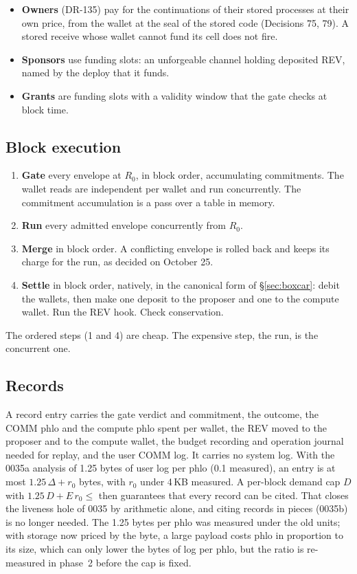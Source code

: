 \documentclass[11pt]{article}
\newcommand{\code}{\path}
\begin{document}
\begin{itemize}
\item \textbf{Owners} (DR-135) pay for the continuations of their stored processes at their own price, from the wallet at the seal of the stored code (Decisions 75, 79). A stored receive whose wallet cannot fund its cell does not fire.
\item \textbf{Sponsors} use funding slots: an unforgeable channel holding deposited REV, named by the deploy that it funds.
\item \textbf{Grants} are funding slots with a validity window that the gate checks at block time.
\end{itemize}

\subsection{Block execution}

\begin{enumerate}
\item \textbf{Gate} every envelope at $R_0$, in block order, accumulating commitments. The wallet reads are independent per wallet and run concurrently. The commitment accumulation is a pass over a table in memory.
\item \textbf{Run} every admitted envelope concurrently from $R_0$.
\item \textbf{Merge} in block order. A conflicting envelope is rolled back and keeps its charge for the run, as decided on October 25.
\item \textbf{Settle} in block order, natively, in the canonical form of \S\ref{sec:boxcar}: debit the wallets, then make one deposit to the proposer and one to the compute wallet. Run the REV hook. Check conservation.
\end{enumerate}
The ordered steps (1 and 4) are cheap. The expensive step, the run, is the concurrent one.

\subsection{Records}

A record entry carries the gate verdict and commitment, the outcome, the COMM phlo and the compute phlo spent per wallet, the REV moved to the proposer and to the compute wallet, the budget recording and operation journal needed for replay, and the user COMM log. It carries no system log. With the 0035a analysis of 1.25 bytes of user log per phlo (0.1 measured), an entry is at most $1.25\,\Delta + r_0$ bytes, with $r_0$ under 4\,KB measured. A per-block demand cap $D$ with $1.25\,D + E\,r_0 \le$ \code{block-record-bytes} then guarantees that every record can be cited. That closes the liveness hole of 0035 by arithmetic alone, and citing records in pieces (0035b) is no longer needed. The 1.25 bytes per phlo was measured under the old units; with storage now priced by the byte, a large payload costs phlo in proportion to its size, which can only lower the bytes of log per phlo, but the ratio is re-measured in phase~2 before the cap is fixed.
\end{document}
